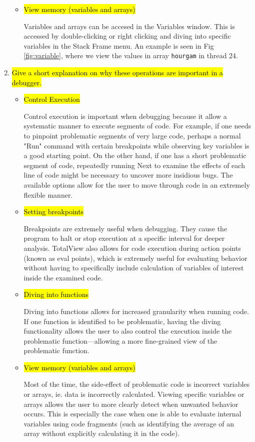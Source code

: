 \documentclass{article}
\begin{document}
\begin{enumerate}
\begin{itemize}
	\item \hl{View memory (variables and arrays)}
	
	Variables and arrays can be accesed in the Variables window. 
	This is accessed by double-clicking or right clicking and diving into specific variables in the Stack Frame menu. 
	An example is seen in Fig \ref{fig:variable}, where we view the values in array \verb!hourgam! in thread 24.

	\end{itemize}
\item \hl{Give a short explanation on why these operations are important in a debugger.}
	\begin{itemize}
	\item \hl{Control Execution}
	
	Control execution is important when debugging because it allow a systematic manner to execute segments of code. 
	For example, if one needs to pinpoint problematic segments of very large code, perhaps a normal "Run" command with certain breakpoints while observing key variables is a good starting point. 
	On the other hand, if one has a short problematic segment of code, repeatedly running Next to examine the effects of each line of code might be necessary to uncover more insidious bugs. 
	The available options allow for the user to move through code in an extremely flexible manner.
	\item \hl{Setting breakpoints}
		
	Breakpoints are extremely useful when debugging. 
	They cause the program to halt or stop execution at a specific interval for deeper analysis. 
	TotalView also allows for code execution during action points (known as eval points), which is extremely useful for evaluating behavior without having to specifically include calculation of variables of interest inside the examined code. 
	\item \hl{Diving into functions}
	
	Diving into functions allows for increased granularity when running code. 
	If one function is identified to be problematic, having the diving functionality allows the user to also control the execution inside the problematic function---allowing a more fine-grained view of the problematic function.	
	\item \hl{View memory (variables and arrays)}
	
	Most of the time, the side-effect of problematic code is incorrect variables or arrays, ie. data is incorrectly calculated. 
	Viewing specific variables or arrays allows the user to more clearly detect when unwanted behavior occurs. 
	This is especially the case when one is able to evaluate internal variables using code fragments (such as identifying the average of an array without explicitly calculating it in the code).

	\end{itemize}

\end{enumerate}
\end{document}
